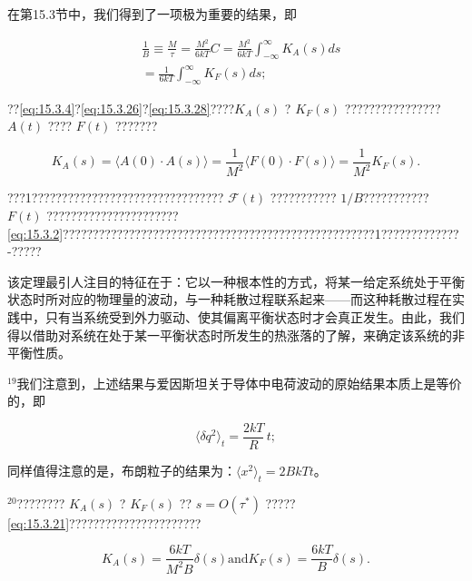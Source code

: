 在第15.3节中，我们得到了一项极为重要的结果，即

\begin{equation}\tag{15.4.52}\label{eq:15.4.52}
\begin{array}{rl} & { \frac { 1 } { B } \equiv \frac { M } { \tau } = \frac { M ^{2} } { 6 k T } C = \frac { M ^{2} } { 6 k T } \int _ { - \infty } ^{\infty} K _ { A } ( s ) d s } \\& { = \frac { 1 } { 6 k T } \int _ { - \infty } ^{\infty} K _ { F } ( s ) d s ; } \end{array}
\end{equation}

??\autoref{eq:15.3.4}?\autoref{eq:15.3.26}?\autoref{eq:15.3.28}????\(K_{A}(s)\) ? \(K_{F}(s)\) ???????????????? \(A(t)\) ???? \(F(t)\) ???????

\begin{equation}\tag{15.4.53}\label{eq:15.4.53}
K _ { A } ( s ) = \langle A ( 0 ) \cdot A ( s ) \rangle = \frac { 1 } { M ^{2} } \langle F ( 0 ) \cdot F ( s ) \rangle = \frac { 1 } { M ^{2} } K _ { F } ( s ) .
\end{equation}

???1???????????????????????????????? \(\mathcal{F}(t)\) ??????????? \(1/B\)??????????? \(F(t)\) ??????????????????????\autoref{eq:15.3.2}????????????????????????????????????????????????????1?????????????-?????

该定理最引人注目的特征在于：它以一种根本性的方式，将某一给定系统处于平衡状态时所对应的物理量的波动，与一种耗散过程联系起来------而这种耗散过程在实践中，只有当系统受到外力驱动、使其偏离平衡状态时才会真正发生。由此，我们得以借助对系统在处于某一平衡状态时所发生的热涨落的了解，来确定该系统的非平衡性质。

\(^{19}\)我们注意到，上述结果与爱因斯坦关于导体中电荷波动的原始结果本质上是等价的，即

\begin{equation}\tag{15.4.54}\label{eq:15.4.54}
\langle \delta q ^{2} \rangle _ { t } = \frac { 2 k T } { R } \, t ;
\end{equation}

同样值得注意的是，布朗粒子的结果为：\(\langle x^{2}\rangle_{t}=2BkTt\)。

\(^{20}\)???????? \(K_{A}(s)\) ? \(K_{F}(s)\) ?? \(s=O(\tau^{*})\) ?????\autoref{eq:15.3.21}??????????????????????

\begin{equation}\tag{15.4.55}\label{eq:15.4.55}
K _ { A } ( s ) = \frac { 6 k T } { M ^{2} B } \delta \left( s \right)  \mathrm { a n d }  K _ { F } ( s ) = \frac { 6 k T } { B } \delta ( s ) .
\end{equation}

